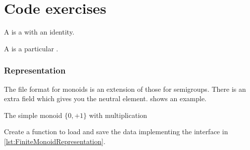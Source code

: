 
\section{\usebox{\chaptergear} Code exercises}

A \Monoid is a \Semigroup with an identity.



A \FiniteMonoid is a particular \FiniteSemigroup.


\subsubsection*{Representation}

The file format for monoids is an extension of those for semigroups.
There is an extra field  which gives you the neutral element.
 shows an example.


\begin{marginfigure}%
    \caption{The simple monoid $\{0,+1\}$ with multiplication}%
    \label{fig:monoid2}%
\end{marginfigure}%


\begin{codeexercise}
    Create a function to load and save the data implementing the
    interface in \cref{lst:FiniteMonoidRepresentation}.
\end{codeexercise}


